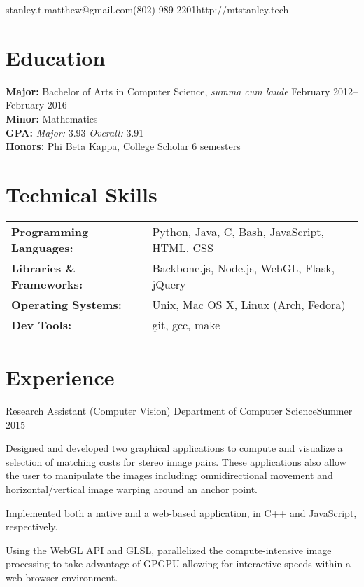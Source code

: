 \documentclass[10pt]{resume}
\begin{document}

\vspace{0.5em}
{stanley.t.matthew@gmail.com}{(802) 989-2201}{http://mtstanley.tech}

\section{Education}

\textbf{Major:} Bachelor of Arts in Computer Science, \textit{summa cum laude} \hfill February 2012--February 2016\\
\textbf{Minor:} Mathematics\\
\textbf{GPA:} \textit{Major:} 3.93 \textit{Overall:} 3.91\\
\textbf{Honors:} Phi Beta Kappa, College Scholar 6 semesters

\section{Technical Skills}
\begin{tabular}{>{\bfseries}l l}
Programming Languages:  &  Python, Java, C, Bash, JavaScript, HTML, CSS \\
Libraries \& Frameworks:&  Backbone.js, Node.js, WebGL, Flask, jQuery   \\
Operating Systems:      &  Unix, Mac OS X, Linux (Arch, Fedora)         \\
Dev Tools:              &  git, gcc, make                               \\
\end{tabular}

\section{Experience}

\expblock
{Research Assistant (Computer Vision) \textnormal{Department of Computer Science}}{Summer 2015} 
{ 
    \item Designed and developed two graphical applications to compute and
    visualize a selection of matching costs for stereo image pairs. These
    applications also allow the user to manipulate the images including:
    omnidirectional movement and horizontal/vertical image warping around
    an anchor point.

    \item Implemented both a native and a web-based application, in C++ and
    JavaScript, respectively.

    \item Using the WebGL API and GLSL, parallelized the compute-intensive
    image processing to take advantage of GPGPU allowing for interactive
    speeds within a web browser environment.
}
\end{document}
